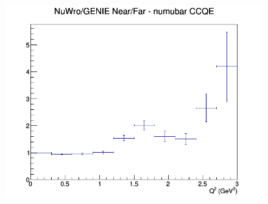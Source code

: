 \documentclass[12pt]{article}
\begin{document}
\begin{figure}[h]
\endminipage
{}
\includegraphics[width=\linewidth]{eff_Q2/GAr/ratios/CCQE_NuWro_GENIE_numubar_NF_Q2.png}
\endminipage
\newline
\end{figure}
\clearpage
\end{document}
